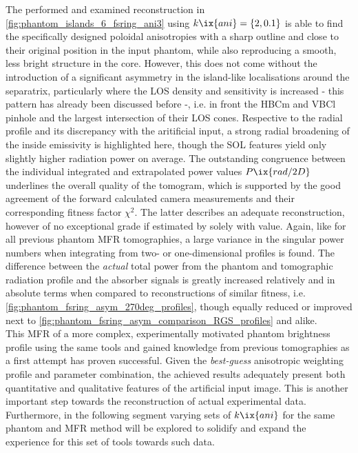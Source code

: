             The performed and examined reconstruction in \cref{fig:phantom_islands_6_fsring_ani3} using $k\ix{ani}=\left\{2, 0.1\right\}$ is able to find the specifically designed poloidal anisotropies with a sharp outline and close to their original position in the input phantom, while also reproducing a smooth, less bright structure in the core. However, this does not come without the introduction of a significant asymmetry in the island-like localisations around the separatrix, particularly where the LOS density and sensitivity is increased - this pattern has already been discussed before -, i.e. in front the HBCm and VBCl pinhole and the largest intersection of their LOS cones. Respective to the radial profile and its discrepancy with the aritificial input, a strong radial broadening of the inside emissivity is highlighted here, though the SOL features yield only slightly higher radiation power on average. The outstanding congruence between the individual integrated and extrapolated power values $P\ix{rad/2D}$ underlines the overall quality of the tomogram, which is supported by the good agreement of the forward calculated camera measurements and their corresponding fitness factor $\chi^{2}$. The latter describes an adequate reconstruction, however of no exceptional grade if estimated by solely with value. Again, like for all previous phantom MFR tomographies, a large variance in the singular power numbers when integrating from two- or one-dimensional profiles is found. The difference between the \textit{actual} total power from the phantom and tomographic radiation profile and the absorber signals is greatly increased relatively and in absolute terms when compared to reconstructions of similar fitness, i.e. \cref{fig:phantom_fsring_asym_270deg_profiles}, though equally reduced or improved next to \cref{fig:phantom_fsring_asym_comparison_RGS_profiles} and alike.\\%
            This MFR of a more complex, experimentally motivated phantom brightness profile using the same tools and gained knowledge from previous tomographies as a first attempt has proven successful. Given the \textit{best-guess} anisotropic weighting profile and parameter combination, the achieved results adequately present both quantitative and qualitative features of the artificial input image. This is another important step towards the reconstruction of actual experimental data. Furthermore, in the following segment varying sets of $k\ix{ani}$ for the same phantom and MFR method will be explored to solidify and expand the experience for this set of tools towards such data.%
%
